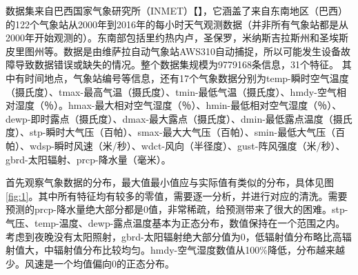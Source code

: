 \documentclass[UTF8]{ctexart}
\begin{document}
数据集来自巴西国家气象研究所（INMET）【\cite{kaggle网站}】，它涵盖了来自东南地区（巴西）的122个气象站从2000年到2016年的每小时天气观测数据（并非所有气象站都是从2000年开始观测的）。东南部包括里约热内卢，圣保罗，米纳斯吉拉斯州和圣埃斯皮里图州等。数据是由维萨拉自动气象站AWS310自动捕捉，所以可能发生设备故障导致数据错误或缺失的情况。整个数据集规模为9779168条信息，31个特征。 其中有时间地点，气象站编号等信息，还有17个气象数据分别为temp-瞬时空气温度（摄氏度）、tmax-最高气温（摄氏度）、tmin-最低气温（摄氏度）、hmdy-空气相对湿度（％）。hmax-最大相对空气湿度（％）、hmin-最低相对空气湿度（％）、dewp-即时露点（摄氏度）、dmax-最大露点（摄氏度）、dmin-最低露点温度（摄氏度）、stp-瞬时大气压（百帕）、smax-最大大气压（百帕）、smin-最低大气压（百帕）、wdsp-瞬时风速（米/秒）、wdct-风向（半径度）、gust-阵风强度（米/秒）、gbrd-太阳辐射、prcp-降水量（毫米）。

首先观察气象数据的分布，最大值最小值应与实际值有类似的分布，具体见图\ref{fig:1}。其中所有特征均有较多的零值，需要逐一分析，并进行对应的清洗。需要预测的prcp-降水量绝大部分都是0值，非常稀疏，给预测带来了很大的困难。stp-气压、temp-温度、dewp-露点温度基本为正态分布，数值保持在一个范围之内。考虑到夜晚没有太阳照射，gbrd-太阳辐射绝大部分值为0，低辐射值分布略比高辐射值大，中辐射值分布比较均匀。hmdy-空气湿度数值从100\%降低，分布越来越少。风速是一个均值偏向0的正态分布。
\end{document}
